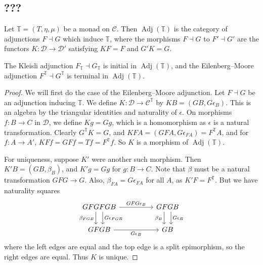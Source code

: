 \subsection{???}
\begin{definition}
    Let \( \mathbb T = (T, \eta, \mu) \) be a monad on \( \mathcal C \).
    Then \( \operatorname{Adj}(\mathbb T) \) is the category of adjunctions \( F \dashv G \) which induce \( \mathbb T \), where the morphisms \( F \dashv G \) to \( F' \dashv G' \) are the functors \( K : \mathcal D \to \mathcal D' \) satisfying \( KF = F \) and \( G' K = G \).
\end{definition}
\begin{theorem}
    The Kleisli adjunction \( F_{\mathbb T} \dashv G_{\mathbb T} \) is initial in \( \operatorname{Adj}(\mathbb T) \), and the Eilenberg--Moore adjunction \( F^{\mathbb T} \dashv G^{\mathbb T} \) is terminal in \( \operatorname{Adj}(\mathbb T) \).
\end{theorem}
\begin{proof}
    We will first do the case of the Eilenberg--Moore adjunction.
    Let \( F \dashv G \) be an adjunction inducing \( \mathbb T \).
    We define \( K : \mathcal D \to \mathcal C^{\mathbb T} \) by \( KB = (GB, G\epsilon_B) \).
    This is an algebra by the triangular identities and naturality of \( \epsilon \).
    On morphisms \( f : B \to C \) in \( \mathcal D \), we define \( Kg = Gg \), which is a homomorphism as \( \epsilon \) is a natural transformation.
    Clearly \( G^{\mathbb T}K = G \), and \( KFA = (GFA, G\epsilon_{FA}) = F^{\mathbb T}A \), and for \( f : A \to A' \), \( KFf = GFf = Tf = F^{\mathbb T} f \).
    So \( K \) is a morphism of \( \operatorname{Adj}(\mathbb T) \).

    For uniqueness, suppose \( K' \) were another such morphism.
    Then \( K'B = (GB, \beta_B) \), and \( K'g = Gg \) for \( g : B \to C \).
    Note that \( \beta \) must be a natural transformation \( GFG \to G \).
    Also, \( \beta_{FA} = G\epsilon_{FA} \) for all \( A \), as \( K'F = F^{\mathbb T} \).
    But we have naturality squares
\[\begin{tikzcd}[column sep=huge]
	GFGFGB & GFGB \\
	GFGB & GB
	\arrow["{\beta_{FGB}}"', shift right=2, from=1-1, to=2-1]
	\arrow["{GFG\epsilon_B}", from=1-1, to=1-2]
	\arrow["{G\epsilon_B}"', from=2-1, to=2-2]
	\arrow["{G\epsilon_{FGB}}", shift left=2, from=1-1, to=2-1]
	\arrow["{\beta_B}"', shift right=2, from=1-2, to=2-2]
	\arrow["{G\epsilon_B}", shift left=2, from=1-2, to=2-2]
\end{tikzcd}\]
    where the left edges are equal and the top edge is a split epimorphism, so the right edges are equal.
    Thus \( K \) is unique.
\end{proof}
